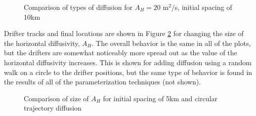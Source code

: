 \documentclass[11pt]{article}
\begin{document}
\begin{figure}
	\centering
	\caption{Comparison of types of diffusion for $A_H=20$ m$^2$/s, initial spacing of 10km}
	\label{diffusiontype}
\end{figure}

Drifter tracks and final locations are shown in Figure \ref{diffusionsize} for changing the size of the horizontal diffusivity, $A_H$. The overall behavior is the same in all of the plots, but the drifters are somewhat noticeably more spread out as the value of the horizontal diffusivity increases. This is shown for adding diffusion using a random walk on a circle to the drifter positions, but the same type of behavior is found in the results of all of the parameterization techniques (not shown).

\begin{figure}
	\centering
	\caption{Comparison of size of $A_H$ for initial spacing of 5km and circular trajectory diffusion}
	\label{diffusionsize}
\end{figure}




\end{document}
